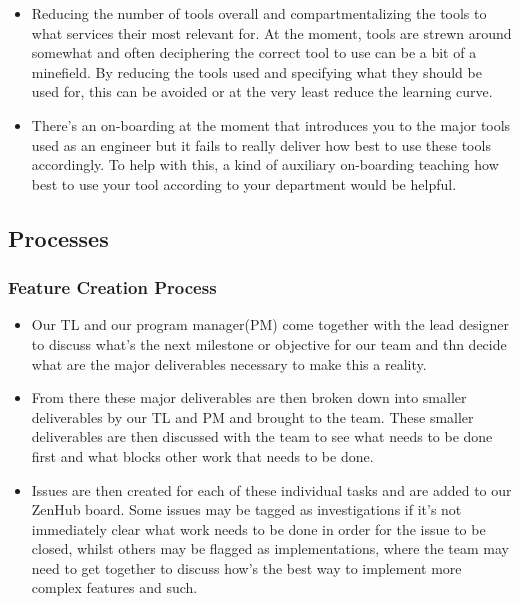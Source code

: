 \documentclass[12pt]{article} %
\begin{document}
\begin{itemize} 
\item Reducing the number of tools overall and compartmentalizing the tools to what services their most relevant for. At the moment, tools are strewn around somewhat and often deciphering the correct tool to use can be a bit of a minefield. By reducing the tools used and specifying what they should be used for, this can be avoided or at the very least reduce the learning curve. 
\item There's an on-boarding at the moment that introduces you to the major tools used as an engineer but it fails to really deliver how best to use these tools accordingly. To help with this, a kind of auxiliary on-boarding teaching how best to use your tool according to your department would be helpful.
\end{itemize}
\newpage
\subsection{Processes}
\subsubsection{Feature Creation Process}
 \begin{itemize}  
 \item Our TL and our program manager(PM) come together with the lead designer to discuss what's the next milestone or objective for our team and thn decide what are the major deliverables necessary to make this a reality. 
 \item From there these major deliverables are then broken down into smaller deliverables by our TL and PM and brought to the team. These smaller deliverables are then discussed with the team to see what needs to be done first and what blocks other work that needs to be done. 
 \item Issues are then created for each of these individual tasks and are added to our ZenHub board. Some issues may be tagged as investigations if it's not immediately clear what work needs to be done in order for the issue to be closed, whilst others may be flagged as implementations, where the team may need to get together to discuss how's the best way to implement more complex features and such.
\\ \end{itemize}
\end{document}
